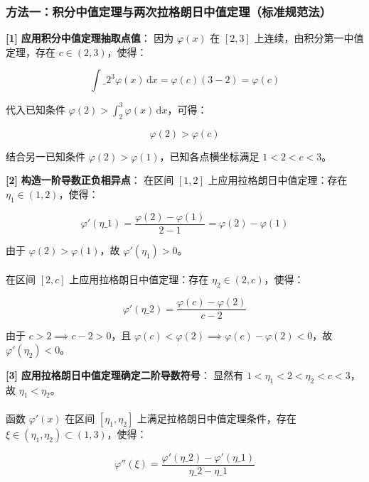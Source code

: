 \documentclass[11pt,a4paper,UTF8]{ctexart}
\begin{document}
\subsubsection{方法一：积分中值定理与两次拉格朗日中值定理（标准规范法）}
\begin{solbox}[分步推导与答题规范]
\textbf{[1]}  \textbf{应用积分中值定理抽取点值}：
因为 $\varphi(x)$ 在 $[2, 3]$ 上连续，由积分第一中值定理，存在 $c \in (2, 3)$，使得：

\begin{equation*}
\int\_2^3 \varphi(x)\,\mathrm{d}x = \varphi(c)(3 - 2) = \varphi(c)
\end{equation*}

代入已知条件 $\varphi(2) > \int_2^3 \varphi(x)\,\mathrm{d}x$，可得：

\begin{equation*}
\varphi(2) > \varphi(c)
\end{equation*}

结合另一已知条件 $\varphi(2) > \varphi(1)$，已知各点横坐标满足 $1 < 2 < c < 3$。

\textbf{[2]}  \textbf{构造一阶导数正负相异点}：
在区间 $[1, 2]$ 上应用拉格朗日中值定理：存在 $\eta_1 \in (1, 2)$，使得：

\begin{equation*}
\varphi'(\eta\_1) = \frac{\varphi(2) - \varphi(1)}{2 - 1} = \varphi(2) - \varphi(1)
\end{equation*}

由于 $\varphi(2) > \varphi(1)$，故 $\varphi'(\eta_1) > 0$。\\ \\
在区间 $[2, c]$ 上应用拉格朗日中值定理：存在 $\eta_2 \in (2, c)$，使得：

\begin{equation*}
\varphi'(\eta\_2) = \frac{\varphi(c) - \varphi(2)}{c - 2}
\end{equation*}

由于 $c > 2 \implies c - 2 > 0$，且 $\varphi(c) < \varphi(2) \implies \varphi(c) - \varphi(2) < 0$，故 $\varphi'(\eta_2) < 0$。

\textbf{[3]}  \textbf{应用拉格朗日中值定理确定二阶导数符号}：
显然有 $1 < \eta_1 < 2 < \eta_2 < c < 3$，故 $\eta_1 < \eta_2$。\\ \\
函数 $\varphi'(x)$ 在区间 $[\eta_1, \eta_2]$ 上满足拉格朗日中值定理条件，存在 $\xi \in (\eta_1, \eta_2) \subset (1, 3)$，使得：

\begin{equation*}
\varphi''(\xi) = \frac{\varphi'(\eta\_2) - \varphi'(\eta\_1)}{\eta\_2 - \eta\_1}
\end{equation*}


\end{solbox}
\end{document}
